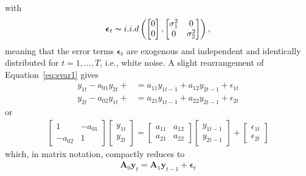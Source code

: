 \documentclass[a4paper,11pt,listof=nochaptergap,oneside,pointednumbers,bibtotoc,bigheadings,liststotoc,hidelinks]{scrbook}
\theoremstyle{mysatz}
\theoremstyle{mydefinition}
\theoremstyle{mytheorem}
\theoremstyle{mybemerkung}
\newcommand{\vect}[1]{\boldsymbol{\mathbf{#1}}}
\begin{document}
with 
\begin{equation}
\begin{split}
	\vect{\epsilon}_t \thicksim i.i.d \left (  \begin{bmatrix}
    							0 \\
    							0
 							 \end{bmatrix}, \begin{bmatrix}
    							\sigma_{1}^2 & 0  \\
    							0 & \sigma_{2}^2
 							 \end{bmatrix} \right ),
\end{split}								
\end{equation}
meaning that the error terms $\vect{\epsilon}_t$ are exogenous and independent and identically distributed  for $t = 1, \dots, T$, i.e., white noise. A slight rearrangement of Equation~\ref{eq:svar1} gives 
\begin{equation} \label{eq:svar2}
\begin{split}
	y_{1t} - a_{01}y_{2t} + & = a_{11}y_{1t-1} + a_{12}y_{2t-1} + \epsilon_{1t} \\
	y_{2t} - a_{02}y_{1t} +  & = a_{21}y_{1t-1} + a_{22}y_{2t-1} + \epsilon_{2t}
\end{split}								
\end{equation}
or 
\begin{equation} \label{eq:svar3}
\begin{split}
	\begin{bmatrix}
    	1 & -a_{01} \\
    	-a_{02} & 1
 	\end{bmatrix}
	\begin{bmatrix}
    	y_{1t} \\
    	y_{2t}
 	\end{bmatrix} = 
	\begin{bmatrix}
    	a_{11} & a_{12} \\
    	a_{21} & a_{22}
 	\end{bmatrix} 
	\begin{bmatrix}
    	y_{1t-1} \\
    	y_{2t-1}
 	\end{bmatrix} +
	\begin{bmatrix}
    	\epsilon_{1t} \\
    	\epsilon_{2t}
 	\end{bmatrix} 
\end{split}								
\end{equation}
which, in matrix notation, compactly reduces to 
\begin{equation} \label{eq:svar4}
\begin{split}
	\vect{A}_0\vect{y}_t = \vect{A}_1\vect{y}_{t-1} + \vect{\epsilon}_t
\end{split}								
\end{equation}
\end{document}
